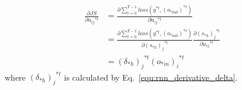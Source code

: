 \documentclass[runningheads,openany]{xhlPaper}
\begin{document}
\begin{equation}
\label{equ:rnn_derivative_u_t}
\begin{aligned}
\frac{{\partial JS}}{{\partial {u_{ij}}^{*t}}} &= \frac{{\partial \sum\limits_{t = 0}^{T - 1} {loss\left( {{y^{*t}},{{\left( {{o_{*out}}} \right)}^{*t}}} \right)} }}{{\partial {u_{ij}}^{*t}}}\\
 &= \frac{{\partial \sum\limits_{t = 0}^{T - 1} {loss\left( {{y^{*t}},{{\left( {{o_{*out}}} \right)}^{*t}}} \right)} }}{{\partial {{\left( {{s_{*h}}} \right)}_j}^{*t}}}\frac{{\partial {{\left( {{s_{*h}}} \right)}_j}^{*t}}}{{\partial {u_{ij}}^{*t}}}\\
 &= {\left( {{\delta _{*h}}} \right)_j}^{*t}{\left( {{o_{*in}}} \right)_i}^{*t}
\end{aligned}
\end{equation}
where ${\left( {{\delta _{*h}}} \right)_j}^{*t}$ is calculated by Eq.~\ref{equ:rnn_derivative_delta}.
\end{document}
